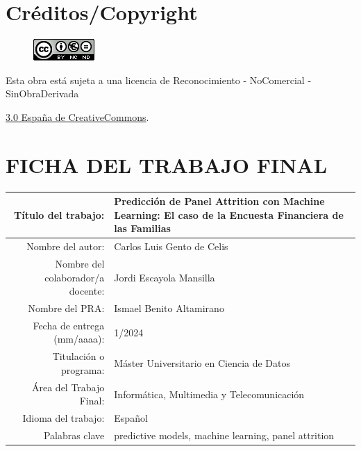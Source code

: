 \setcounter{page}{1} 
\pagestyle{plain}

\chapter*{Créditos/Copyright}

\vspace{1cm}

\begin{figure}[ht]
    \centering
	\includegraphics[scale=1]{images/license.png}
\end{figure}

Esta obra está sujeta a una licencia de Reconocimiento -  NoComercial - SinObraDerivada

\href{https://creativecommons.org/licenses/by-nc-nd/3.0/es/}{3.0 España de CreativeCommons}.

\chapter*{FICHA DEL TRABAJO FINAL}

\begin{table}[ht]
	\centering{}
	\renewcommand{\arraystretch}{2}
	\begin{tabular}{r | p{9.5cm}}
		\hline
		Título del trabajo: & Predicción de Panel Attrition con Machine Learning: El caso de la Encuesta Financiera de las Familias\\
		\hline
        Nombre del autor: & Carlos Luis Gento de Celis\\
		\hline
        Nombre del colaborador/a docente: & Jordi Escayola Mansilla\\
		\hline
        Nombre del PRA: & Ismael Benito Altamirano\\
		\hline
        Fecha de entrega (mm/aaaa): & 1/2024\\
		\hline
        Titulación o programa: & Máster Universitario en Ciencia de Datos\\
		\hline
        Área del Trabajo Final: & Informática, Multimedia y Telecomunicación\\
		\hline
        Idioma del trabajo: & Español\\
		\hline
        Palabras clave & predictive models, machine learning, panel attrition\\
		\hline
	\end{tabular}
\end{table}

